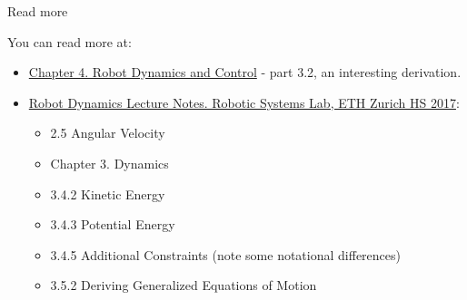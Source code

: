 \documentclass{beamer}
\begin{document}
%
%		
%		
%		
%		
%		
%		
%		




\begin{frame}{Read more}
	\begin{flushleft}
		
		You can read more at:
		
		\begin{itemize}
			\item \textcolor{blue}{\href{https://www.cds.caltech.edu/~murray/books/MLS/pdf/mls94-manipdyn_v1_2.pdf}{Chapter 4. Robot Dynamics and
				Control}}
			 - part 3.2, an interesting derivation.
			\item \textcolor{blue}{\href{https://ethz.ch/content/dam/ethz/special-interest/mavt/robotics-n-intelligent-systems/rsl-dam/documents/RobotDynamics2017/RD_HS2017script.pdf}{Robot Dynamics Lecture Notes. Robotic Systems Lab, ETH Zurich HS 2017}}:
			\begin{itemize}
				\item 2.5 Angular Velocity
				\item Chapter 3. Dynamics
				\item 3.4.2 Kinetic Energy
				\item 3.4.3 Potential Energy
				\item 3.4.5 Additional Constraints (note some notational differences)
				\item 3.5.2 Deriving Generalized Equations of Motion
			\end{itemize}
\end{itemize}

\end{flushleft}
\end{frame}
\end{document}
